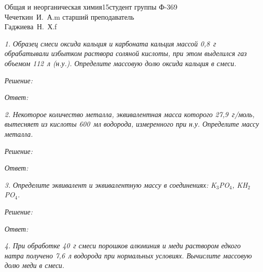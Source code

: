 




\newcommand{\bi}[1]{\( _{#1} \)}
\renewcommand{\.}{\;\!}



{Общая и неорганическая химия}{}{15}{студент группы Ф-369\\Чечеткин~И.~А.}{m}
{старший преподаватель\\Гаджиева~Н.~Х.}{f}


\emph{1. Образец смеси оксида кальция и карбоната кальция массой 0,8~г
обрабатывали избытком раствора соляной кислоты, при этом выделился газ объемом
112~л (н.у.). Определите массовую долю оксида кальция в смеси.}

\vspace*{2em}
\emph{Решение:}

\vspace*{2em}
\emph{Ответ: }

\newpage %

\emph{2. Некоторое количество металла, эквивалентная масса которого
27,9~г/моль, вытесняет из кислоты 600~мл водорода, измеренного при н.у.
Определите массу металла.}

\vspace*{2em}
\emph{Решение:}

\vspace*{2em}
\emph{Ответ: }

\newpage %

\emph{3. Определите эквивалент и эквивалентную массу в соединениях:
K\bi{3}\.PO\bi{4}, K\.H\bi{2}\.PO\bi{4}.}

\vspace*{2em}
\emph{Решение:}

\vspace*{2em}
\emph{Ответ: }

\newpage %

\emph{4. При обработке 40~г смеси порошков алюминия и меди раствором едкого
натра получено 7,6~л водорода при нормальных условиях. Вычислите массовую долю
меди в смеси.}

